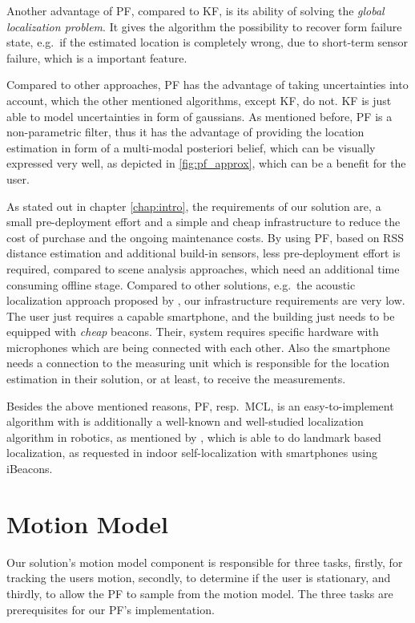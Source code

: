 Another advantage of \acs{PF}, compared to \acs{KF}, is its ability of solving the \emph{global localization problem}. It gives the algorithm the possibility to recover form failure state, e.g.\ if the estimated location is completely wrong, due to short-term sensor failure, which is a important feature.

Compared to other approaches, \acs{PF} has the advantage of taking uncertainties into account, which the other mentioned algorithms, except \acs{KF}, do not. \acs{KF} is just able to model uncertainties in form of gaussians. As mentioned before, \acs{PF} is a non-parametric filter, thus it has the advantage of providing the location estimation in form of a multi-modal posteriori belief, which can be visually expressed very well, as depicted in \ref{fig:pf_approx}, which can be a benefit for the user.

As stated out in chapter \ref{chap:intro}, the requirements of our solution are, a small pre-deployment effort and a simple and cheap infrastructure to reduce the cost of purchase and the ongoing maintenance costs. By using \acs{PF}, based on \acs{RSS} distance estimation and additional build-in sensors, less pre-deployment effort is required, compared to scene analysis approaches, which need an additional time consuming offline stage. Compared to other solutions, e.g.\ the acoustic localization approach proposed by \citet{hoflinger:acoustic}, our infrastructure requirements are very low. The user just requires a capable smartphone, and the building just needs to be equipped with \emph{cheap} beacons. Their, system requires specific hardware with microphones which are being connected with each other. Also the smartphone needs a connection to the measuring unit which is responsible for the location estimation in their solution, or at least, to receive the measurements.

Besides the above mentioned reasons, \acl{PF}, resp.\ \acs{MCL}, is an easy-to-implement algorithm with is additionally a well-known and well-studied localization algorithm in robotics, as mentioned by \citet{thrun:prob_robo}, which is able to do landmark based localization, as requested in indoor self-localization with smartphones using iBeacons.

\section{Motion Model}\label{sec:algo_motion_model}
Our solution's motion model component is responsible for three tasks, firstly, for tracking the users motion, secondly, to determine if the user is stationary, and thirdly, to allow the \acs{PF} to sample from the motion model. The three tasks are prerequisites for our \acs{PF}'s implementation.

